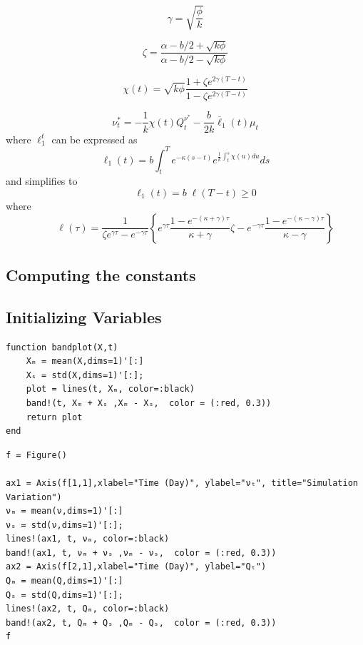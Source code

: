 \begin{displaymath}
	\gamma = \sqrt{\frac{\phi}{k}}
\end{displaymath}

\begin{displaymath}
	\zeta = \frac{\alpha -b/2 + \sqrt{k \phi}}{\alpha -b/2 - \sqrt{k \phi}}
\end{displaymath}

\begin{displaymath}
	\chi(t) = \sqrt{k \phi} \frac{1+\zeta e^{2\gamma(T-t)}}{1-\zeta e^{2\gamma(T-t)}}
\end{displaymath}

\begin{displaymath}
	\nu_{t}^{*}=-\frac{1}{k} \chi(t) Q_{t}^{\nu^{*}}-\frac{b}{2 k} \overline{\ell}_{1}(t) \mu_{t}
\end{displaymath}
where $\ell_{1}^{t}$ can be expressed as
\begin{displaymath}
	\ell_{1}(t)=b \int_{t}^{T} e^{-\kappa(s-t)} e^{\frac{1}{k} \int_{t}^{s}\chi(u) d u}  d s
\end{displaymath}
and  simplifies to
\begin{displaymath}
	{\qquad \ell_{1}(t)=b \;\ell(T-t) \geq 0}
\end{displaymath}
where
\begin{displaymath}
	{\qquad \ell(\tau)=\frac{1}{\zeta e^{\gamma \tau}-e^{-\gamma \tau}}\left\{e^{\gamma \tau} \frac{1-e^{-(\kappa+\gamma) \tau}}{\kappa+\gamma} \zeta-e^{-\gamma \tau} \frac{1-e^{-(\kappa-\gamma) \tau}}{\kappa-\gamma}\right\}}
\end{displaymath}

\subsection{Computing the constants}

\subsection{Initializing Variables}

\begin{lstlisting}[language=JuliaLocal, style=julia]
function bandplot(X,t)
    Xₘ = mean(X,dims=1)'[:]
    Xₛ = std(X,dims=1)'[:];
    plot = lines(t, Xₘ, color=:black)
    band!(t, Xₘ + Xₛ ,Xₘ - Xₛ,  color = (:red, 0.3))
    return plot
end
\end{lstlisting}

\begin{lstlisting}[language=JuliaLocal, style=julia]
f = Figure()

ax1 = Axis(f[1,1],xlabel="Time (Day)", ylabel="νₜ", title="Simulation Variation")
νₘ = mean(ν,dims=1)'[:]
νₛ = std(ν,dims=1)'[:];
lines!(ax1, t, νₘ, color=:black)
band!(ax1, t, νₘ + νₛ ,νₘ - νₛ,  color = (:red, 0.3))
ax2 = Axis(f[2,1],xlabel="Time (Day)", ylabel="Qₜ")
Qₘ = mean(Q,dims=1)'[:]
Qₛ = std(Q,dims=1)'[:];
lines!(ax2, t, Qₘ, color=:black)
band!(ax2, t, Qₘ + Qₛ ,Qₘ - Qₛ,  color = (:red, 0.3))
f
\end{lstlisting}

